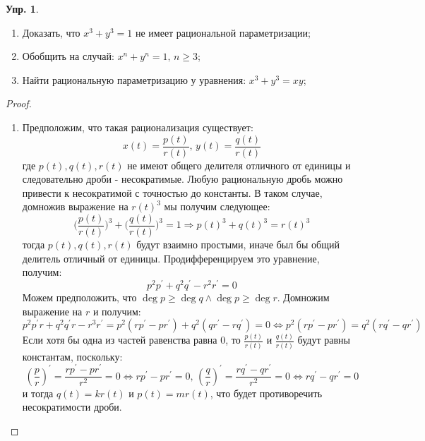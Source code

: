 \documentclass[12pt]{article}
\theoremstyle{definition}
\newtheorem{exrc}{Упр.}
\begin{document}
\begin{exrc}\hfill
	\begin{enumerate}[label={(\alph*)}]
		\item Доказать, что $x^3 + y^3 = 1$ не имеет рациональной параметризации;
		\item Обобщить на случай: $x^n + y^n = 1, \, n \geq 3$;
		\item Найти рациональную параметризацию у уравнения: $x^3 + y^3 = xy$;
	\end{enumerate}
\end{exrc}
\begin{proof}\hfill
	\begin{enumerate}[label={(\alph*)}]
		\item Предположим, что такая рационализация существует: 
		$$
			x(t) = \dfrac{p(t)}{r(t)}, \, y(t) = \dfrac{q(t)}{r(t)}
		$$
		где $p(t), q(t), r(t)$ не имеют общего делителя отличного от единицы и следовательно дроби - несократимые. Любую рациональную дробь можно привести к несократимой с точностью до константы. В таком случае, домножив выражение на $r(t)^3$ мы получим следующее: 
		$$
			\bigg(\dfrac{p(t)}{r(t)}\bigg)^3 + \bigg(\dfrac{q(t)}{r(t)}\bigg)^3 = 1 \Rightarrow p(t)^3 + q(t)^3 = r(t)^3
		$$ 
		тогда $p(t), q(t), r(t)$ будут взаимно простыми, иначе был бы общий делитель отличный от единицы. Продифференцируем это уравнение, получим:
		$$
			p^2 p^\prime + q^2 q^\prime - r^2r^\prime = 0 
		$$
		Можем предположить, что $\deg{p} \geq \deg{q} \wedge \deg{p} \geq \deg{r}$. Домножим выражение на $r$ и получим:
		$$
			p^2p^\prime r + q^2 q^\prime r - r^3 r^\prime = p^2(rp^\prime - pr^\prime) + q^2 (qr^\prime - rq^\prime) = 0 \Leftrightarrow p^2(rp^\prime - pr^\prime) = q^2 (rq^\prime - qr^\prime ) 
		$$
		Если хотя бы одна из частей равенства равна $0$, то $\tfrac{p(t)}{r(t)}$ и $\tfrac{q(t)}{r(t)}$ будут равны константам, поскольку:
		$$
			\left( \dfrac{p}{r} \right)^\prime = \dfrac{rp^\prime - pr^\prime}{r^2} = 0 \Leftrightarrow rp^\prime - pr^\prime = 0, \, \left( \dfrac{q}{r} \right)^\prime = \dfrac{rq^\prime - qr^\prime}{r^2} = 0 \Leftrightarrow rq^\prime - q r^\prime = 0
		$$
		и тогда $q(t) = kr(t)$ и $p(t) = mr(t)$, что будет противоречить несократимости дроби. 
		

\end{enumerate}
\end{proof}
\end{document}
